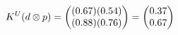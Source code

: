 \documentclass[preview]{standalone}
\begin{document}
\begin{align*}
\special{dvisvgm:raw <g id='unique000'>}K^U(d \otimes p) = \begin{pmatrix} (0.67)(0.54) \\ (0.88)(0.76) \end{pmatrix} = \begin{pmatrix} 0.37 \\ 0.67 \end{pmatrix}\special{dvisvgm:raw </g>}
\end{align*}
\end{document}
